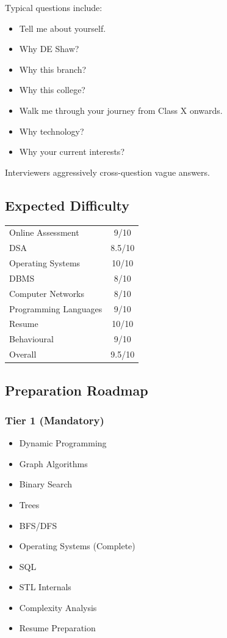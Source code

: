 \documentclass[11pt,a4paper]{article}
\begin{document}
Typical questions include:

\begin{itemize}
	\item Tell me about yourself.
	\item Why DE Shaw?
	\item Why this branch?
	\item Why this college?
	\item Walk me through your journey from Class X onwards.
	\item Why technology?
	\item Why your current interests?
\end{itemize}

Interviewers aggressively cross-question vague answers.


\subsection{Expected Difficulty}

\begin{center}
	\begin{tabular}{|l|c|}
		\hline
		Online Assessment & 9/10 \\
		DSA & 8.5/10 \\
		Operating Systems & 10/10 \\
		DBMS & 8/10 \\
		Computer Networks & 8/10 \\
		Programming Languages & 9/10 \\
		Resume & 10/10 \\
		Behavioural & 9/10 \\
		Overall & 9.5/10 \\
		\hline
	\end{tabular}
\end{center}


\subsection{Preparation Roadmap}

\subsubsection{Tier 1 (Mandatory)}

\begin{itemize}
	\item Dynamic Programming
	\item Graph Algorithms
	\item Binary Search
	\item Trees
	\item BFS/DFS
	\item Operating Systems (Complete)
	\item SQL
	\item STL Internals
	\item Complexity Analysis
	\item Resume Preparation
\end{itemize}
\end{document}
